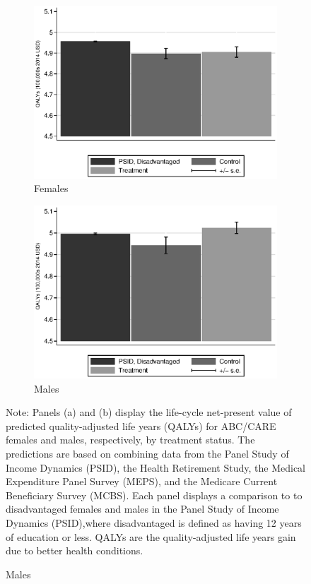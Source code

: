 \begin{figure}
\centering
\caption{Quality Adjusted Life Years, Predictions and Comparison to PSID}\label{fig:qalys}
\begin{subfigure}[h]{0.5\textwidth}
		\centering
		\caption{Females} \label{fig:qabcare1}
		\includegraphics[width=\textwidth]{output/qalyexppsid_0.eps}
\end{subfigure}%
\begin{subfigure}[h]{0.5\textwidth}
	\centering
	\caption{Males} \label{fig:qpsid1}
		\includegraphics[width=\textwidth]{output/qalyexppsid_1.eps}
\end{subfigure}
\footnotesize \justify
Note: Panels (a) and (b) display the life-cycle net-present value of predicted quality-adjusted life years (QALYs) for ABC/CARE females and males, respectively, by treatment status. The predictions are based on combining data from the Panel Study of Income Dynamics (PSID), the Health Retirement Study, the Medical Expenditure Panel Survey (MEPS), and the Medicare Current Beneficiary Survey (MCBS). Each panel displays a comparison to to disadvantaged females and males in the Panel Study of Income Dynamics (PSID),where disadvantaged is defined as having 12 years of education or less. QALYs are the quality-adjusted life years gain due to better health conditions.\\
\end{figure}

